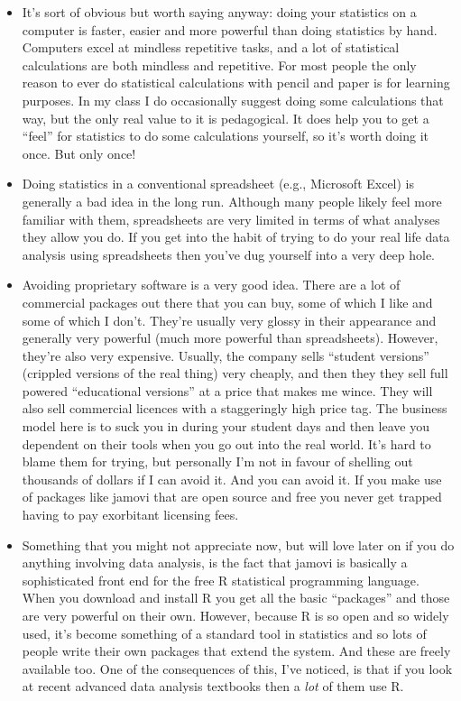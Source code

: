\documentclass[
]{book}
\providecommand{\tightlist}{%
  \setlength{\itemsep}{0pt}\setlength{\parskip}{0pt}}
\begin{document}
\begin{itemize}
\tightlist
\item
  It's sort of obvious but worth saying anyway: doing your statistics on a computer is faster, easier and more powerful than doing statistics by hand. Computers excel at mindless repetitive tasks, and a lot of statistical calculations are both mindless and repetitive. For most people the only reason to ever do statistical calculations with pencil and paper is for learning purposes. In my class I do occasionally suggest doing some calculations that way, but the only real value to it is pedagogical. It does help you to get a ``feel'' for statistics to do some calculations yourself, so it's worth doing it once. But only once!
\item
  Doing statistics in a conventional spreadsheet (e.g., Microsoft Excel) is generally a bad idea in the long run. Although many people likely feel more familiar with them, spreadsheets are very limited in terms of what analyses they allow you do. If you get into the habit of trying to do your real life data analysis using spreadsheets then you've dug yourself into a very deep hole.
\item
  Avoiding proprietary software is a very good idea. There are a lot of commercial packages out there that you can buy, some of which I like and some of which I don't. They're usually very glossy in their appearance and generally very powerful (much more powerful than spreadsheets). However, they're also very expensive. Usually, the company sells ``student versions'' (crippled versions of the real thing) very cheaply, and then they they sell full powered ``educational versions'' at a price that makes me wince. They will also sell commercial licences with a staggeringly high price tag. The business model here is to suck you in during your student days and then leave you dependent on their tools when you go out into the real world. It's hard to blame them for trying, but personally I'm not in favour of shelling out thousands of dollars if I can avoid it. And you can avoid it. If you make use of packages like jamovi that are open source and free you never get trapped having to pay exorbitant licensing fees.
\item
  Something that you might not appreciate now, but will love later on if you do anything involving data analysis, is the fact that jamovi is basically a sophisticated front end for the free R statistical programming language. When you download and install R you get all the basic ``packages'' and those are very powerful on their own. However, because R is so open and so widely used, it's become something of a standard tool in statistics and so lots of people write their own packages that extend the system. And these are freely available too. One of the consequences of this, I've noticed, is that if you look at recent advanced data analysis textbooks then a \emph{lot} of them use R.
\end{itemize}
\end{document}
